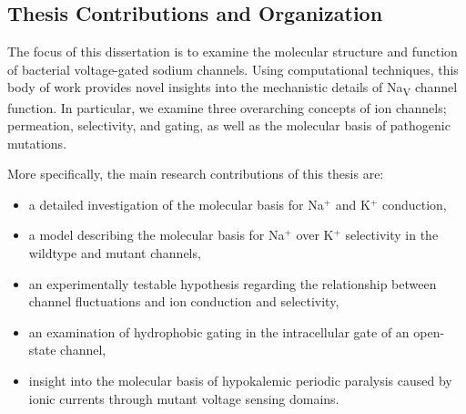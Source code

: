 \begin{refsection}

\section{Thesis Contributions and Organization}


The focus of this dissertation is to examine the molecular structure and function of bacterial voltage-gated sodium channels. Using computational techniques, this body of work provides novel insights into the mechanistic details of Na\textsubscript{V} channel function. In particular, we examine three overarching concepts of ion channels; permeation, selectivity, and gating, as well as the molecular basis of pathogenic mutations.

More specifically, the main research contributions of this thesis are:
\begin{itemize}
\item a detailed investigation of the molecular basis for Na$^+$ and K$^+$ conduction,
\item a model describing the molecular basis for Na$^+$ over K$^+$ selectivity in the wildtype and mutant channels, 
\item an experimentally testable hypothesis regarding the relationship between channel fluctuations and ion conduction and selectivity,
\item an examination of hydrophobic gating in the intracellular gate of an open-state channel,
\item insight into the molecular basis of hypokalemic periodic paralysis caused by ionic currents through mutant voltage sensing domains.
\end{itemize}


\end{refsection}
